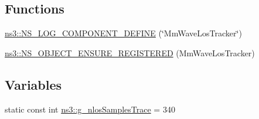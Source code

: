 \subsection*{Functions}
\begin{DoxyCompactItemize}
\item 
\hyperlink{namespacens3_a7bd8d08939b047c5caba6e476aed0e5b}{ns3\+::\+N\+S\+\_\+\+L\+O\+G\+\_\+\+C\+O\+M\+P\+O\+N\+E\+N\+T\+\_\+\+D\+E\+F\+I\+NE} (\char`\"{}Mm\+Wave\+Los\+Tracker\char`\"{})
\item 
\hyperlink{namespacens3_a90f1d376603d942c5edfa15499251b56}{ns3\+::\+N\+S\+\_\+\+O\+B\+J\+E\+C\+T\+\_\+\+E\+N\+S\+U\+R\+E\+\_\+\+R\+E\+G\+I\+S\+T\+E\+R\+ED} (Mm\+Wave\+Los\+Tracker)
\end{DoxyCompactItemize}
\subsection*{Variables}
\begin{DoxyCompactItemize}
\item 
static const int \hyperlink{namespacens3_aa27c343924716ad4dac244babcba8297}{ns3\+::g\+\_\+nlos\+Samples\+Trace} = 340
\end{DoxyCompactItemize}
